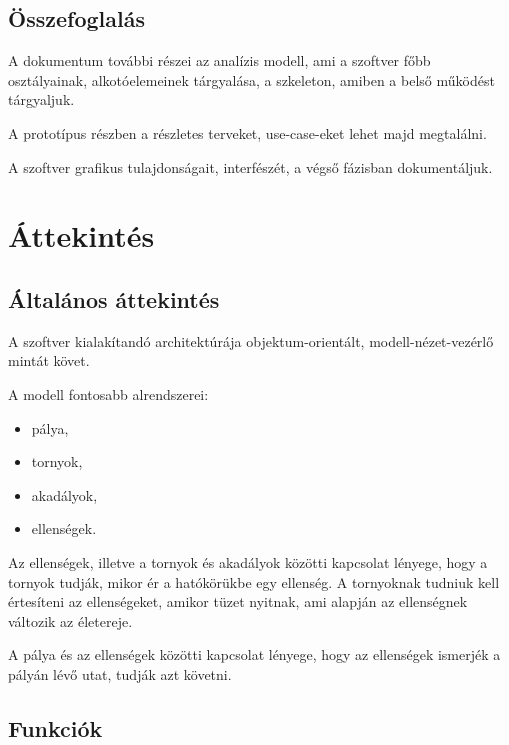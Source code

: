 
\subsection{Összefoglalás}

A dokumentum további részei az analízis modell, ami a szoftver főbb osztályainak, alkotóelemeinek tárgyalása, a szkeleton, amiben a belső működést tárgyaljuk.

A prototípus részben a részletes terveket, use-case-eket lehet majd megtalálni.

A szoftver grafikus tulajdonságait, interfészét, a végső fázisban dokumentáljuk.




\section{Áttekintés}
\subsection{Általános áttekintés}
A szoftver kialakítandó architektúrája objektum-orientált, modell-nézet-vezérlő mintát követ.

A modell fontosabb alrendszerei:
\begin{itemize}
\item pálya, 
\item tornyok, 
\item akadályok, 
\item ellenségek.
\end{itemize} 
	 
Az ellenségek, illetve a tornyok és akadályok közötti kapcsolat lényege, hogy a tornyok tudják, mikor ér a hatókörükbe egy ellenség. A tornyoknak tudniuk kell értesíteni az ellenségeket, amikor tüzet nyitnak, ami alapján az ellenségnek változik az életereje.
 
A pálya és az ellenségek közötti kapcsolat lényege, hogy az ellenségek ismerjék a pályán lévő utat, tudják azt követni.


\subsection{Funkciók}
